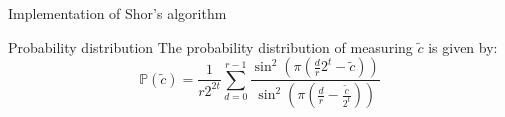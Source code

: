 \begin{frame}{Implementation of Shor's algorithm}

\begin{block}{Probability distribution}
The probability distribution of measuring $\tilde{c}$ is given by:
\[
\mathbb{P}(\tilde{c})=\frac{1}{r2^{2t}}\sum_{d=0}^{r-1} \frac{\sin^2\left(\pi \left( \frac{d}{r}2^t -  \tilde{c} \right) \right)}{\sin^2\left(\pi \left( \frac{d}{r} -  \frac{\tilde{c}}{2^t} \right) \right)}
\]
\end{block}

\end{frame}